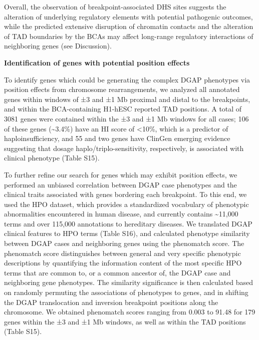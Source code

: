 \documentclass[a4paper,twoside=true,openright,parskip=full,chapterprefix=true,11pt,headings=normal,bibliography=totoc,listof=totoc,titlepage=on,captions=tableabove,draft=false]{scrreprt}
\theoremstyle{definition}
\theoremstyle{definition}
\theoremstyle{definition}
\theoremstyle{remark}
\begin{document}
Overall, the observation of breakpoint-associated DHS sites suggests the
alteration of underlying regulatory elements with potential pathogenic
outcomes, while the predicted extensive disruption of chromatin contacts
and the alteration of TAD boundaries by the BCAs may affect long-range
regulatory interactions of neighboring genes (see Discussion).

\textbf{Identification of genes with potential position effects}

To identify genes which could be generating the complex DGAP phenotypes
via position effects from chromosome rearrangements, we analyzed all
annotated genes within windows of ±3 and ±1 Mb proximal and distal to
the breakpoints, and within the BCA-containing H1-hESC reported TAD
positions. A total of 3081 genes were contained within the ±3 and ±1 Mb
windows for all cases; 106 of these genes (\textasciitilde{}3.4\%) have
an HI score of \textless{}10\%, which is a predictor of
haploinsufficiency,\citep{Huang2010} and 55 and two genes have ClinGen
emerging evidence suggesting that dosage haplo/triplo-sensitivity,
respectively, is associated with clinical phenotype (Table S15).

To further refine our search for genes which may exhibit position
effects, we performed an unbiased correlation between DGAP case
phenotypes and the clinical traits associated with genes bordering each
breakpoint. To this end, we used the HPO dataset,\citep{Kohler2014}
which provides a standardized vocabulary of phenotypic abnormalities
encountered in human disease, and currently contains
\textasciitilde{}11,000 terms and over 115,000 annotations to hereditary
diseases. We translated DGAP clinical features to HPO terms (Table S16),
and calculated phenotype similarity between DGAP cases and neighboring
genes using the phenomatch score.\citep{Ibn-Salem2014} The phenomatch
score distinguishes between general and very specific phenotypic
descriptions by quantifying the information content of the most speciﬁc
HPO terms that are common to, or a common ancestor of, the DGAP case and
neighboring gene phenotypes. The similarity significance is then
calculated based on randomly permuting the associations of phenotypes to
genes, and in shifting the DGAP translocation and inversion breakpoint
positions along the chromosome. We obtained phenomatch scores ranging
from 0.003 to 91.48 for 179 genes within the ±3 and ±1 Mb windows, as
well as within the TAD positions (Table S15).
\end{document}

